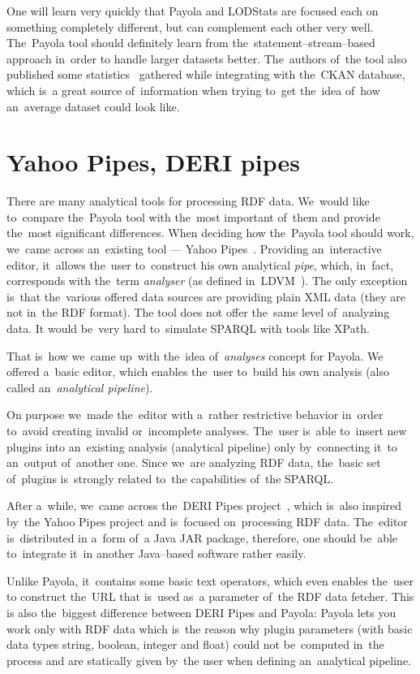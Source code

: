 One will learn very quickly that Payola and LODStats are focused each 
on something completely different, but can complement each other very well. The~Payola 
tool should definitely learn from the~statement--stream--based approach in~order 
to handle larger datasets better. The~authors of~the tool also published
some statistics~\cite{lodstats} gathered while integrating with the~CKAN database, which is~a 
great source of~information when trying to~get the~idea of~how an~average dataset 
could look like. 

\section{Yahoo Pipes, DERI pipes}
There are many analytical tools for processing RDF data. We~would like to~compare the~Payola tool with the~most important of~them and provide the~most significant 
differences. When deciding how the~Payola tool should work, we~came 
across an~existing tool --- Yahoo 
Pipes~\cite{yahoo-pipes}. Providing an~interactive 
editor, it~allows the~user to~construct his own analytical \emph{pipe}, 
which, in~fact, corresponds with the~term \emph{analyser} (as defined in~LDVM~\cite{ldvm}).
The only exception is~that the~various offered data sources are
providing plain XML data (they are not in~the RDF format).
The tool does not offer the~same level of~analyzing data.
It would be~very hard to~simulate SPARQL with tools like XPath.

That is~how we~came up~with the~idea of~\emph{analyses} concept for Payola. 
We offered a~basic editor, which enables the~user to~build his own analysis
(also called an~\emph{analytical pipeline}).
 
On purpose we~made the~editor with a~rather restrictive behavior in~order to~avoid creating invalid or~incomplete analyses. The~user is~able to~insert new 
plugins into an~existing analysis (analytical pipeline) only by~connecting it~to an~output of~another 
one. Since we~are analyzing RDF data, the~basic set of~plugins is~strongly 
related to~the capabilities of~the SPARQL.

After a~while, we~came across the~DERI Pipes 
project~\cite{deri-pipes}, which is~also inspired by~the Yahoo 
Pipes project and is~focused on~processing RDF data. The~editor is~distributed 
in a~form of~a Java JAR package, therefore, one should be~able to~integrate it~in another
Java--based software rather easily.

Unlike Payola, it~contains some basic text operators, which even enables the~user  
to construct the~URL that is~used as~a parameter of~the RDF data fetcher. This 
is also the~biggest difference between DERI Pipes and Payola: Payola lets 
you work only with RDF data which is~the reason why plugin parameters (with basic data types string,
boolean, integer and float) could not be~computed in~the process and are 
statically given by~the user when defining an~analytical pipeline.

